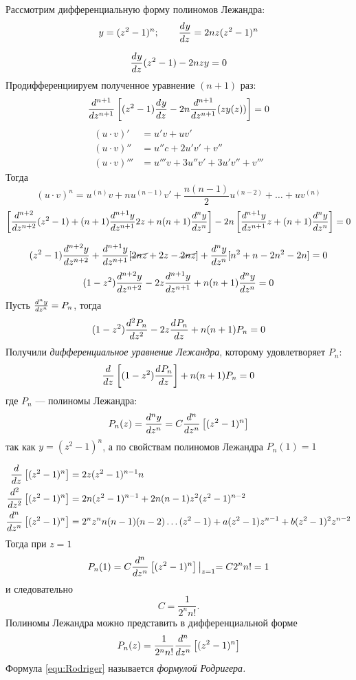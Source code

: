 
Рассмотрим дифференциальную форму полиномов Лежандра:
\[
    y = (z^2 - 1)^n; \qquad \frac{d^{}y}{dz^{}} = 2 n z (z^2 - 1)^n
\]

\[
    \frac{d^{}y}{dz^{}}(z^2 - 1) - 2 n z y = 0
\]
Продифференциируем полученное уравнение $(n + 1)$ раз:
\[
    \frac{d^{n + 1}}{dz^{n + 1}} \left[(z^2 - 1) \frac{d^{}y}{dz^{}} - 2 n \frac{d^{n + 1}}{dz^{n + 1}} (z y(z))\right] = 0
\]
\begin{align*}
	(u \cdot v)' &= u' v + u v'\\
	(u \cdot v)'' &= u'' c + 2 u' v' + v''\\
	(u \cdot v)''' &= u''' v + 3 u'' v' + 3 u' v '' + v'''
\end{align*}
Тогда 
\begin{equation}
	(u \cdot v)^n = u^{(n)} v + n u^{(n - 1)} v' + \frac{n(n - 1)}{2} u^{(n - 2)} + \ldots + u v^{(n)}
	\label{equ:AttachedLajandr5}
\end{equation}
\[
    \left[\frac{d^{n + 2}}{dz^{n + 2}} (z^2 - 1) + (n + 1) \frac{d^{n+1}y}{dz^{n+1}} 2 z +n(n + 1) \frac{d^{n}y}{dz^{n}} \right] - 2 n \left[\frac{d^{n + 1}y}{dz^{n + 1}} z + (n + 1) \frac{d^{n}y}{dz^{n}}  \right] = 0
\]

\[
    (z^2 - 1) \frac{d^{n + 2}y}{dz^{n + 2}} + \frac{d^{n + 1}y}{dz^{n + 1}} [\cancel{2 nz} + 2z - \cancel{2 nz}] + \frac{d^{n}y}{dz^{n}}[n^2 + n - 2n^2 - 2n] = 0
\]
\begin{equation}
	(1 - z^2) \frac{d^{n + 2}y}{dz^{n + 2}} - 2 z \frac{d^{n + 1}y}{dz^{n + 1}} + n(n + 1) \frac{d^{n}y}{dz^{n}} = 0
	\label{equ:AttachedLajandr6}
\end{equation}
Пусть $\frac{d^{n}y}{dz^{n}} = P_n$, тогда
\[
    (1 - z^2) \frac{d^{2}P_n}{dz^{2}} - 2 z \frac{d^{}P_n}{dz^{}} + n(n + 1)P_n = 0
\]
Получили \textit{дифференциальное уравнение Лежандра}, которому удовлетворяет $P_n$:
\begin{equation}
    \frac{d^{}}{dz^{}} \left[(1 -z^2) \frac{d^{}P_n}{dz^{}} \right] + n (n + 1) P_n = 0
	\label{equ:equLejandr}
\end{equation}
где $P_n$ --- полиномы Лежандра:
\[
    P_n(z) = \frac{d^{n}y}{dz^{n}} = C \frac{d^{n}}{dz^{n}} \left[(z^2 - 1)^n \right]
\]
так как $y = (z^2 - 1)^n$, а по свойствам полиномов Лежандра $P_n(1) = 1$

\begin{align*}
    \frac{d^{}}{dz^{}}\left[(z^2 - 1)^n \right] &= 2 z (z^2 - 1)^{n - 1} n\\
    \frac{d^{2}}{dz^{2}} \left[(z^2 - 1)^n \right] &= 2 n(z^2 - 1)^{n - 1} + 2 n (n - 1)z^2 (z^2 - 1)^{n - 2}\\
    \frac{d^{n}}{dz^{n}} \left[(z^2 - 1)^n \right] &= 2^n z^n n (n - 1)(n - 2) \ldots (z^2 - 1) + a(z^2 - 1) z^{n - 1} +b(z^2 - 1)^2 z^{n - 2}
\end{align*}
Тогда при $z = 1$
\[
    P_n(1) = C \frac{d^{n}}{dz^{n}} \left[ (z^2 - 1)^n \right] \bigl|_{z = 1} = C 2^n n! = 1
\]
и следовательно
\[
    C = \frac{1}{2^n n!}.
\]
Полиномы Лежандра можно представить в дифференциальной форме
\begin{equation}
    P_n(z) = \frac{1}{2^n n!} \frac{d^{n}}{dz^{n}} \left[(z^2 - 1)^n \right]
    \label{equ:Rodriger}
\end{equation}
Формула \eqref{equ:Rodriger} называется \textit{формулой Родригера.}\\
